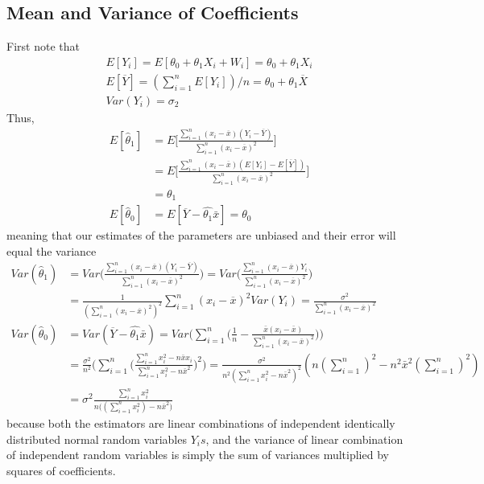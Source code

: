 \documentclass[../probability-notes.tex]{subfiles}
\begin{document}
    \subsection{Mean and Variance of Coefficients}
    First note that
    \begin{gather*}
        E[Y_{i}] = E[\theta_{0} + \theta_{1}X_{i} + W_{i}] = \theta_{0} + \theta_{1}X_{i}\\
        E[\overline{Y}] = (\sum_{i=1}^{n} E[Y_{i}])/n = \theta_{0} + \theta_{1}\overline{X}\\
        Var(Y_{i}) = \sigma_{2}
    \end{gather*}
    Thus,
    \begin{align*}
        E[\hat{\theta}_{1}] &= E\bigg[ \frac{\sum_{i=1}^{n} (x_{i} - \overline{x}) (Y_{i} - \overline{Y})}{\sum_{i=1}^{n}(x_{i} - \overline{x})^{2}} \bigg]\\ 
        &= E\bigg[ \frac{\sum_{i=1}^{n} (x_{i} - \overline{x}) (E[Y_{i}] - E[\overline{Y}])}{\sum_{i=1}^{n}(x_{i} - \overline{x})^{2}} \bigg]\\
        &= \theta_{1}\\
        E[\hat{\theta}_{0}] &= E[\overline{Y} - \hat{\theta_{1}} \bar{x}] = \theta_{0}
    \end{align*}
    meaning that our estimates of the parameters are unbiased and their error will equal the variance
    \begin{align*}
        Var(\hat{\theta}_{1}) &= Var \bigg( \frac{\sum_{i=1}^{n} (x_{i} - \overline{x}) (Y_{i} - \overline{Y})}{\sum_{i=1}^{n}(x_{i} - \overline{x})^{2}} \bigg)
        = Var \bigg( \frac{\sum_{i=1}^{n} (x_{i} - \overline{x})Y_{i}}{\sum_{i=1}^{n}(x_{i} - \overline{x})^{2}} \bigg)\\
        &= \frac{1}{(\sum_{i=1}^{n}(x_{i} - \overline{x})^{2})^{2}} \sum_{i=1}^{n} (x_{i} - \overline{x})^{2} Var(Y_{i})
        = \frac{\sigma^{2}}{\sum_{i=1}^{n}(x_{i} - \overline{x})^{2}}\\
        Var(\hat{\theta}_{0}) &= Var(\overline{Y} - \hat{\theta_{1}} \bar{x})
        = Var \bigg( \sum_{i=1}^{n} \bigg( \frac{1}{n} - \frac{\bar{x}(x_{i} - \bar{x})}{\sum_{i=1}^{n}(x_{i} - \bar{x})^{2}} \bigg) \bigg)\\
        &= \frac{\sigma^{2}}{n^{2}} \bigg( \sum_{i=1}^{n} \bigg( \frac{\sum_{i=1}^{n}x_{i}^{2} - n\bar{x}x_{i}}{\sum_{i=1}^{n}x_{i}^{2} - n\bar{x}^{2}} \bigg)^{2} \bigg)
        = \frac{\sigma^{2}}{n^{2} (\sum_{i=1}^{n}x_{i}^{2} - n\bar{x}^{2})^{2}} (n(\sum_{i=1}^{n})^{2} - n^{2}\bar{x}^{2}(\sum_{i=1}^{n})^{2})\\
        &= \sigma^{2} \frac{\sum_{i=1}^{n} x_{i}^{2}}{n\big((\sum_{i=1}^{n} x_{i}^{2}) - n\bar{x}^{2} \big)}
    \end{align*}
    because both the estimators are linear combinations of independent identically distributed normal random variables $Y_{i}s$, and the variance of linear combination of independent random variables is simply the sum of variances multiplied by squares of coefficients.\newline
\end{document}
